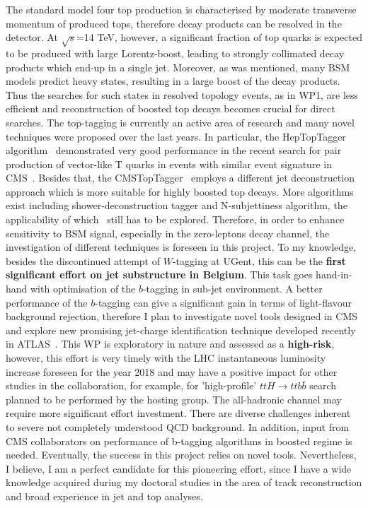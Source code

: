 \textcolor{\mynew}{
The standard model four top production is characterised by moderate transverse momentum of produced tops, therefore decay products can be resolved in the detector. At $\sqrt{s}$=14 TeV, however, a significant fraction of top quarks is expected to be produced with large Lorentz-boost, leading to strongly collimated decay products which end-up in a single jet. 
Moreover, as was mentioned, many BSM models predict heavy states, resulting in a large boost of the decay products. Thus the searches for such states in resolved topology events, as in WP1, are less efficient and reconstruction of boosted top decays becomes crucial for direct searches. 
}
\textcolor{\mynew}{
The top-tagging is currently an active area of research and many novel techniques were proposed over the last years. In particular, the HepTopTagger algorithm~\cite{heptoptagger} demonstrated very good performance in the recent search for pair production of vector-like T quarks in events with similar event signature in CMS~\cite{Khachatryan:2015oba}. Besides that, the CMSTopTagger~\cite{Kaplan:2008ie} employs a different jet deconstruction approach which is more suitable for highly boosted top decays. More algorithms exist including shower-deconstruction tagger and N-subjettiness algorithm, the applicability of which~\cite{CMS:2014fya} still has to be explored. Therefore, in order to enhance sensitivity to BSM \fourtop signal, especially in the zero-leptons decay channel, the investigation of different techniques is foreseen in this project. To my knowledge, besides the discontinued attempt of $W$-tagging at UGent, this can be the \textbf{first significant effort on jet substructure in Belgium}.
}
\textcolor{\mynew}{
This task goes hand-in-hand with optimisation of the $b$-tagging in sub-jet environment. A better performance of the $b$-tagging can give a significant gain in terms of light-flavour background rejection, therefore I plan to investigate novel tools designed in CMS~\cite{Bertolini:2014bba} and explore new promising jet-charge identification technique developed recently in ATLAS~\cite{Aad:2015cua,ATLAS:2015jetcharge}.
}
\textcolor{\mynew}{
This WP is exploratory in nature and assessed as a \textbf{high-risk}, however, this effort is very timely with the LHC instantaneous luminosity increase foreseen for the year 2018 and may have a positive impact for other studies in the collaboration, for example, for 'high-profile' $ttH \rightarrow ttb\bar{b}$ search planned to be performed by the hosting group. The all-hadronic channel may require more significant effort investment. There are diverse challenges inherent to severe not completely understood QCD background. In addition, input from CMS collaborators on performance of b-tagging algorithms in boosted regime is needed. Eventually, the success in this project relies on novel tools. Nevertheless, I believe, I am a perfect candidate for this pioneering effort, since I have a wide knowledge acquired during my doctoral studies in the area of track reconstruction and broad experience in jet and top analyses.
}
